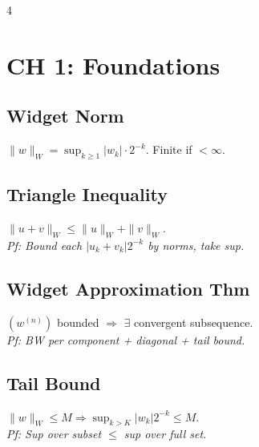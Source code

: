 \documentclass[6pt, a4paper, landscape]{extarticle}
\newcommand{\pf}[1]{\textit{\tiny Pf: #1}}
\begin{document}
\vspace*{-18pt}
\begin{multicols}{4}
\raggedcolumns


\section*{CH 1: Foundations}

\subsection{Widget Norm}
$\|w\|_W = \sup_{k \ge 1} |w_k| \cdot 2^{-k}$. Finite if $< \infty$.

\subsection{Triangle Inequality}
$\|u+v\|_W \le \|u\|_W + \|v\|_W$.\\
\pf{Bound each $|u_k+v_k|2^{-k}$ by norms, take sup.}

\subsection{Widget Approximation Thm}
$(w^{(n)})$ bounded $\Rightarrow$ $\exists$ convergent subsequence.\\
\pf{BW per component + diagonal + tail bound.}

\subsection{Tail Bound}
$\|w\|_W \le M \Rightarrow \sup_{k>K}|w_k|2^{-k} \le M$.\\
\pf{Sup over subset $\le$ sup over full set.}


\end{multicols}
\end{document}

